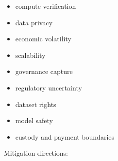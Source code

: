 ﻿\documentclass[12pt]{article}
\begin{document}
\begin{itemize}
  \item compute verification
\end{itemize}
\begin{itemize}
  \item data privacy
\end{itemize}
\begin{itemize}
  \item economic volatility
\end{itemize}
\begin{itemize}
  \item scalability
\end{itemize}
\begin{itemize}
  \item governance capture
\end{itemize}
\begin{itemize}
  \item regulatory uncertainty
\end{itemize}
\begin{itemize}
  \item dataset rights
\end{itemize}
\begin{itemize}
  \item model safety
\end{itemize}
\begin{itemize}
  \item custody and payment boundaries
\end{itemize}

Mitigation directions:
\end{document}
